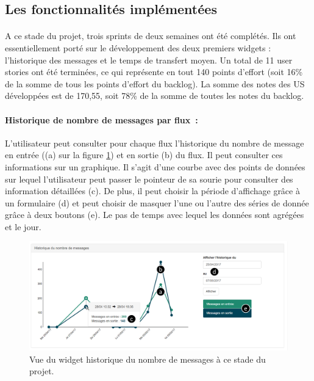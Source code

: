		\subsection{Les fonctionnalités implémentées}
			\paragraph{}%
			A ce stade du projet, trois sprints de deux semaines ont été complétés. Ils
			ont essentiellement porté sur le développement des deux premiers widgets :
			l'historique des messages et le temps de transfert moyen. Un total de 11 user
			stories ont été terminées, ce qui représente en tout 140 points d'effort
			(soit 16\% de la somme de tous les points d'effort du backlog). La somme des
			notes des US développées est de 170,55, soit 78\% de la somme de toutes
			les notes du backlog.
		
			\paragraph{Historique de nombre de messages par flux~: }
			L'utilisateur peut consulter pour chaque flux l'historique du nombre de
			message en entrée ((a) sur la figure \ref{vue_history}) et en sortie (b) du
			flux. Il peut consulter ces informations sur un graphique. Il s'agit d'une courbe avec des points de données sur
			lequel l'utilisateur peut passer le pointeur de sa sourie pour consulter des
			information détaillées (c). De plus, il peut choisir la période d'affichage
			grâce à un formulaire (d) et peut choisir de masquer l'une ou l'autre des
			séries de donnée grâce à deux boutons (e). Le pas de temps avec lequel les
			données sont agrégées et le jour.
			\begin{figure}[H]
				\centering
				\includegraphics[width=12cm]{../img/part3/vue_history.png}
				\caption{\label{vue_history} Vue du widget historique du nombre de messages
				à ce stade du projet.}
			\end{figure}
			
